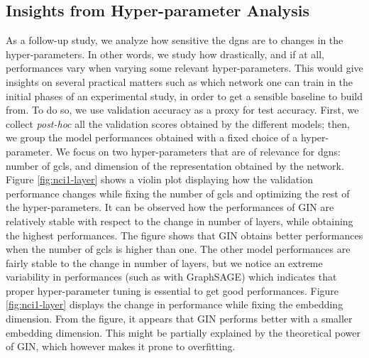 \subsection{Insights from Hyper-parameter Analysis}
As a follow-up study, we analyze how sensitive the \glspl{dgn} are to changes in the hyper-parameters. In other words, we study how drastically, and if at all, performances vary when varying some relevant hyper-parameters. This would give insights on several practical matters such as which network one can train in the initial phases of an experimental study, in order to get a sensible baseline to build from. To do so, we use validation accuracy as a proxy for test accuracy. First, we collect \emph{post-hoc} all the validation scores obtained by the different models; then, we group the model performances obtained with a fixed choice of a hyper-parameter. We focus on two hyper-parameters that are of relevance for \glspl{dgn}: number of \glspl{gcl}, and dimension of the representation obtained by the network. Figure \ref{fig:nci1-layer} shows a violin plot displaying how the validation performance changes while fixing the number of \glspl{gcl} and optimizing the rest of the hyper-parameters. It can be observed how the performances of GIN are relatively stable with respect to the change in number of layers, while obtaining the highest performances. The figure shows that GIN obtains better performances when the number of \glspl{gcl} is higher than one. The other model performances are fairly stable to the change in number of layers, but we notice an extreme variability in performances (such as with GraphSAGE) which indicates that proper hyper-parameter tuning is essential to get good performances. Figure \ref{fig:nci1-layer} displays the change in performance while fixing the embedding dimension.  From the figure, it appears that GIN performs better with a smaller embedding dimension. This might be partially explained by the theoretical power of GIN, which however makes it prone to overfitting.


